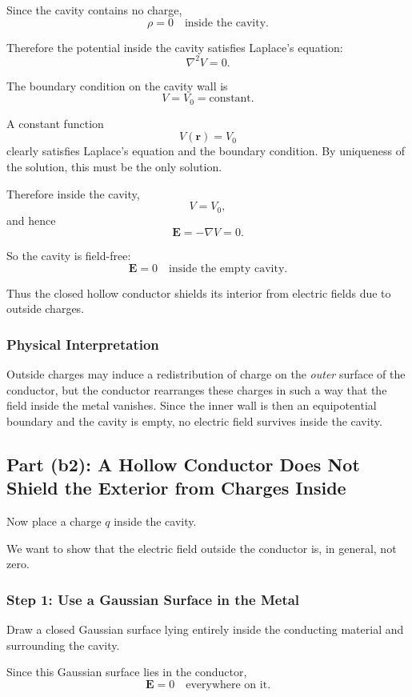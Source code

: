 \documentclass[hidelinks]{article}
\begin{document}
Since the cavity contains no charge,
\[
\rho=0
\quad \text{inside the cavity.}
\]

Therefore the potential inside the cavity satisfies Laplace's equation:
\[
\nabla^2 V=0.
\]

The boundary condition on the cavity wall is
\[
V=V_0=\text{constant}.
\]

A constant function
\[
V(\mathbf{r})=V_0
\]
clearly satisfies Laplace's equation and the boundary condition. By uniqueness of the solution, this must be the only solution.

Therefore inside the cavity,
\[
V=V_0,
\]
and hence
\[
\mathbf{E}=-\nabla V=0.
\]

So the cavity is field-free:
\[
\boxed{\mathbf{E}=0 \quad \text{inside the empty cavity.}}
\]

Thus the closed hollow conductor shields its interior from electric fields due to outside charges.

\subsubsection{Physical Interpretation}

Outside charges may induce a redistribution of charge on the \emph{outer} surface of the conductor, but the conductor rearranges these charges in such a way that the field inside the metal vanishes. Since the inner wall is then an equipotential boundary and the cavity is empty, no electric field survives inside the cavity.

\subsection{Part (b2): A Hollow Conductor Does Not Shield the Exterior from Charges Inside}

Now place a charge $q$ inside the cavity.

We want to show that the electric field outside the conductor is, in general, not zero.

\subsubsection{Step 1: Use a Gaussian Surface in the Metal}

Draw a closed Gaussian surface lying entirely inside the conducting material and surrounding the cavity.

Since this Gaussian surface lies in the conductor,
\[
\mathbf{E}=0
\quad \text{everywhere on it.}
\]
\end{document}
